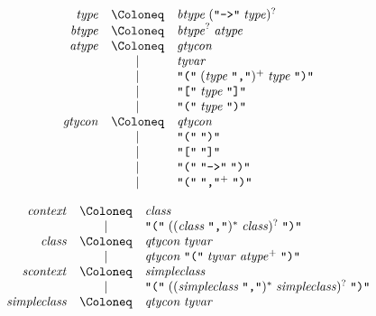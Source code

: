 \begin{align*}
  \begin{array}{rcl}
    \mathit{type}
    & \Coloneq & \mathit{btype}\; (\text{\texttt{\textquotedbl ->\textquotedbl}}\; \mathit{type})^? \\
    \mathit{btype}
    & \Coloneq & \mathit{btype}^?\; \mathit{atype} \\
    \mathit{atype}
    & \Coloneq & \mathit{gtycon} \\
    & \mid & \mathit{tyvar} \\
    & \mid & \text{\texttt{\textquotedbl(\textquotedbl}}\; (\mathit{type}\; \text{\texttt{\textquotedbl,\textquotedbl}})^+\; \mathit{type}\; \text{\texttt{\textquotedbl)\textquotedbl}} \\
    & \mid & \text{\texttt{\textquotedbl[\textquotedbl}}\; \mathit{type}\; \text{\texttt{\textquotedbl]\textquotedbl}} \\
    & \mid & \text{\texttt{\textquotedbl(\textquotedbl}}\; \mathit{type}\; \text{\texttt{\textquotedbl)\textquotedbl}} \\
    \mathit{gtycon}
    & \Coloneq & \mathit{qtycon} \\
    & \mid & \text{\texttt{\textquotedbl(\textquotedbl}}\; \text{\texttt{\textquotedbl)\textquotedbl}} \\
    & \mid & \text{\texttt{\textquotedbl[\textquotedbl}}\; \text{\texttt{\textquotedbl]\textquotedbl}} \\
    & \mid & \text{\texttt{\textquotedbl(\textquotedbl}}\; \text{\texttt{\textquotedbl ->\textquotedbl}}\; \text{\texttt{\textquotedbl)\textquotedbl}} \\
    & \mid & \text{\texttt{\textquotedbl(\textquotedbl}}\; \text{\texttt{\textquotedbl,\textquotedbl}}^+\; \text{\texttt{\textquotedbl)\textquotedbl}}
  \end{array}
\end{align*}

\begin{align*}
  \begin{array}{rcl}
    \mathit{context}
    & \Coloneq & \mathit{class} \\
    & \mid & \text{\texttt{\textquotedbl(\textquotedbl}}\; ((\mathit{class}\; \text{\texttt{\textquotedbl,\textquotedbl}})^*\; \mathit{class})^?\; \text{\texttt{\textquotedbl)\textquotedbl}}
    \\
    \mathit{class}
    & \Coloneq & \mathit{qtycon}\; \mathit{tyvar} \\
    & \mid & \mathit{qtycon}\; \text{\texttt{\textquotedbl(\textquotedbl}}\; \mathit{tyvar}\; \mathit{atype}^+\; \text{\texttt{\textquotedbl)\textquotedbl}} \\
    \mathit{scontext}
    & \Coloneq & \mathit{simpleclass} \\
    & \mid & \text{\texttt{\textquotedbl(\textquotedbl}}\; ((\mathit{simpleclass}\; \text{\texttt{\textquotedbl,\textquotedbl}})^*\; \mathit{simpleclass})^?\; \text{\texttt{\textquotedbl)\textquotedbl}}
    \\
    \mathit{simpleclass}
    & \Coloneq & \mathit{qtycon}\; \mathit{tyvar}
  \end{array}
\end{align*}

